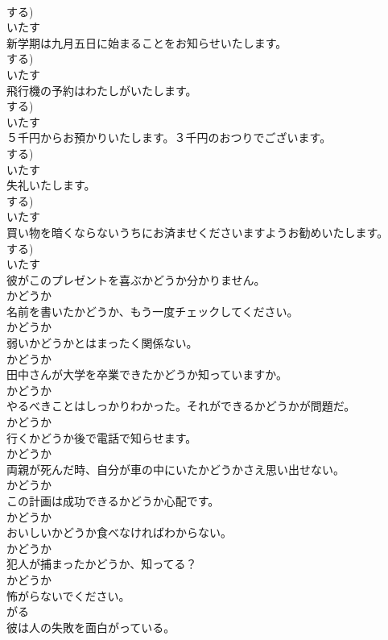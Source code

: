 \documentclass[8pt]{extreport}
\begin{document}
\begin{CJK}{UTF8}{min}
\\	する)	
\\	いたす
\\	新学期は九月五日に始まることをお知らせいたします。	
\\	する)	
\\	いたす
\\	飛行機の予約はわたしがいたします。	
\\	する)	
\\	いたす
\\	５千円からお預かりいたします。３千円のおつりでございます。	
\\	する)	
\\	いたす
\\	失礼いたします。	
\\	する)	
\\	いたす
\\	買い物を暗くならないうちにお済ませくださいますようお勧めいたします。	
\\	する)	
\\	いたす
\\	彼がこのプレゼントを喜ぶかどうか分かりません。	
\\	かどうか
\\	名前を書いたかどうか、もう一度チェックしてください。	
\\	かどうか
\\	弱いかどうかとはまったく関係ない。	
\\	かどうか
\\	田中さんが大学を卒業できたかどうか知っていますか。	
\\	かどうか
\\	やるべきことはしっかりわかった。それができるかどうかが問題だ。	
\\	かどうか
\\	行くかどうか後で電話で知らせます。	
\\	かどうか
\\	両親が死んだ時、自分が車の中にいたかどうかさえ思い出せない。	
\\	かどうか
\\	この計画は成功できるかどうか心配です。	
\\	かどうか
\\	おいしいかどうか食べなければわからない。	
\\	かどうか
\\	犯人が捕まったかどうか、知ってる？	
\\	かどうか
\\	怖がらないでください。	
\\	がる
\\	彼は人の失敗を面白がっている。	

\end{CJK}
\end{document}
